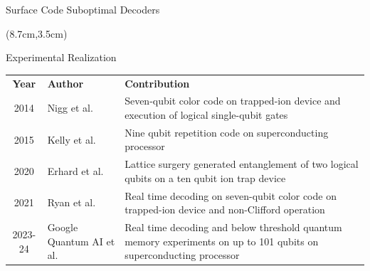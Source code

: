 \documentclass{dfki}
\begin{document}
\begin{frame}{Surface Code Suboptimal Decoders}
{\begin{textblock*}{6cm}
\begin{small}
\begin{itemize}
			\end{itemize}
		\end{small}
	\end{textblock*}
	\begin{textblock*}{10cm}(8.7cm,3.5cm)  %
	\end{textblock*}
	}
	\pause
\end{frame}

\begin{frame}{Experimental Realization}
	\vspace{-18pt}
	\begin{table}[h]
		\fontsize{10pt}{10pt}\selectfont
        \renewcommand{\arraystretch}{1.5} %
		\begin{tabular}{c|p{3cm}|p{8.5cm}}
			\textbf{Year} & \textbf{Author} & \textbf{Contribution} \\
			2014 & Nigg et al. & Seven-qubit color code on trapped-ion device and execution of logical single-qubit gates \cite{nigg_quantum_2014} \\
			2015 & Kelly et al. &  Nine qubit repetition code on superconducting processor \cite{kelly_state_2015} \\
			2020 & Erhard et al. & Lattice surgery generated entanglement of two logical qubits on a ten qubit ion trap device \cite{erhard_entangling_2020} \\
			2021 & Ryan et al. & Real time decoding on seven-qubit color code on trapped-ion device and non-Clifford operation \cite{ryan-anderson_realization_2021}\\
			2023-24 & Google Quantum AI et al. & Real time decoding and below threshold quantum memory experiments on up to 101 qubits on superconducting processor \cite{google_quantum_ai_suppressing_2023, google_quantum_ai_and_collaborators_quantum_2025}
		\end{tabular}
	\end{table}
\end{frame}
\end{document}
